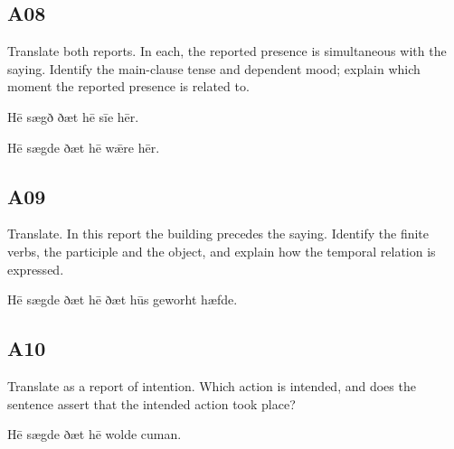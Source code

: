 \subsection*{A08}

\par\begin{minipage}{\linewidth}\raggedright
Translate both reports. In each, the reported presence is simultaneous with the saying. Identify the main-clause tense and dependent mood; explain which moment the reported presence is related to.

Hē sægð ðæt hē sīe hēr.

Hē sægde ðæt hē wǣre hēr.

\end{minipage}\par\addvspace{4pt}

\subsection*{A09}

\par\begin{minipage}{\linewidth}\raggedright
Translate. In this report the building precedes the saying. Identify the finite verbs, the participle and the object, and explain how the temporal relation is expressed.

Hē sægde ðæt hē ðæt hūs geworht hæfde.

\end{minipage}\par\addvspace{4pt}

\subsection*{A10}

\par\begin{minipage}{\linewidth}\raggedright
Translate as a report of intention. Which action is intended, and does the sentence assert that the intended action took place?

Hē sægde ðæt hē wolde cuman.

\end{minipage}\par\addvspace{4pt}

